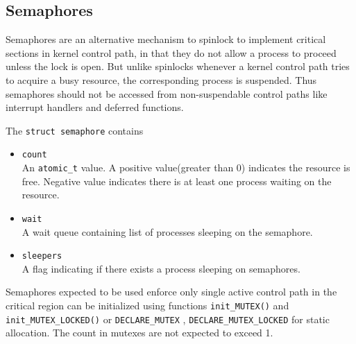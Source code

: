 \documentclass{article}
\begin{document}



\subsection{Semaphores}

Semaphores are an alternative mechanism to spinlock to implement
critical sections in kernel control path, in that they do not allow a
process to proceed unless the lock is open. But unlike spinlocks
whenever a kernel control path tries to acquire a busy resource, the
corresponding process is suspended. Thus semaphores should not be
accessed from non-suspendable control paths like interrupt handlers
and deferred functions.

The \lstinline{struct semaphore} contains

\begin{itemize}  
\item \lstinline{count} \\
  An \lstinline{atomic_t} value. A positive value(greater than 0)
  indicates the resource is free. Negative value indicates there is at
  least one process waiting on the resource.
\item \lstinline{wait} \\
  A wait queue containing list of processes sleeping on the semaphore.  
\item \lstinline{sleepers} \\
  A flag indicating if there exists a process sleeping on semaphores.    
\end{itemize}
Semaphores expected to be used enforce only single active control path
in the critical region can be initialized using functions
\lstinline{init_MUTEX()} and \lstinline{init_MUTEX_LOCKED()} or
\lstinline{DECLARE_MUTEX} , \lstinline{DECLARE_MUTEX_LOCKED} for
static allocation. The count in mutexes are not expected to exceed 1.
\end{document}
